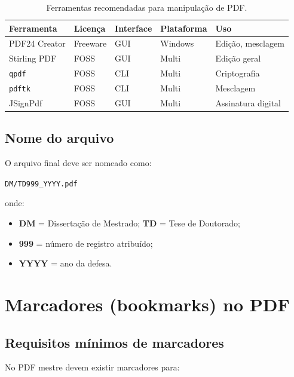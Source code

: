 \begin{table}[H]
  \centering
  \caption{Ferramentas recomendadas para manipulação de PDF.}
  \label{tab:ferramentas-pdf}
  \begin{tabular}{lllll}
    \toprule
    \textbf{Ferramenta} & \textbf{Licença} & \textbf{Interface} & \textbf{Plataforma} & \textbf{Uso} \\
    \midrule
    PDF24 Creator & Freeware & \ac{GUI} & Windows & Edição, mesclagem \\
    Stirling PDF & \ac{FOSS} & \ac{GUI} & Multi & Edição geral \\
    \texttt{qpdf} & \ac{FOSS} & \ac{CLI} & Multi & Criptografia \\
    \texttt{pdftk} & \ac{FOSS} & \ac{CLI} & Multi & Mesclagem \\
    JSignPdf & \ac{FOSS} & \ac{GUI} & Multi & Assinatura digital \\
    \bottomrule
  \end{tabular}
\end{table}

\subsection{Nome do arquivo}

O arquivo final deve ser nomeado como:

\begin{center}
\texttt{DM/TD999\_YYYY.pdf}
\end{center}

onde:

\begin{itemize}
    \item \textbf{DM} = Dissertação de Mestrado; \textbf{TD} = Tese de Doutorado;
    \item \textbf{999} = número de registro atribuído;
    \item \textbf{YYYY} = ano da defesa.
\end{itemize}

\section{Marcadores (bookmarks) no PDF}\label{sec:cap6-bookmarks}

\subsection{Requisitos mínimos de marcadores}

No PDF mestre devem existir marcadores para:

